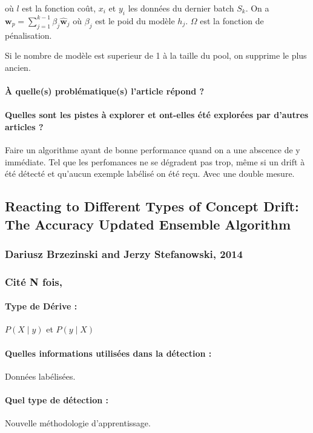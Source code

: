\documentclass[11pt,a4paper]{report}
\begin{document}
où $l$ est la fonction coût, $x_i$ et $y_i$ les données du dernier batch $S_k$. On a $\mathbf{w}_{p}=\sum_{j=1}^{k-1} \beta_{j} \hat{\mathbf{w}}_{j}$ où $\beta_j$ est le poid du modèle $h_j$. $\Omega$ est la fonction de pénalisation.

Si le nombre de modèle est superieur de 1 à la taille du pool, on supprime le plus ancien.

\paragraph{À quelle(s) problématique(s) l'article répond ?} 

\paragraph{Quelles sont les pistes à explorer et ont-elles  été explorées par d'autres articles ?}  Faire un algorithme ayant de bonne performance quand on a une abscence de y immédiate. Tel que les perfomances ne se dégradent pas trop, même si un drift à été détecté et qu'aucun exemple labélisé on été reçu. Avec une double mesure.







\subsection{Reacting to Different Types of Concept Drift: The Accuracy Updated Ensemble Algorithm}
\subsubsection{Dariusz Brzezinski and Jerzy Stefanowski, 2014}

\subsubsection{Cité N fois, }

\paragraph{Type de Dérive :} $P(X\mid y)$ et $P(y \mid X)$
\paragraph{Quelles informations utilisées dans la détection :} Données labélisées.
\paragraph{Quel type de détection :} Nouvelle méthodologie d'apprentissage.
\end{document}
